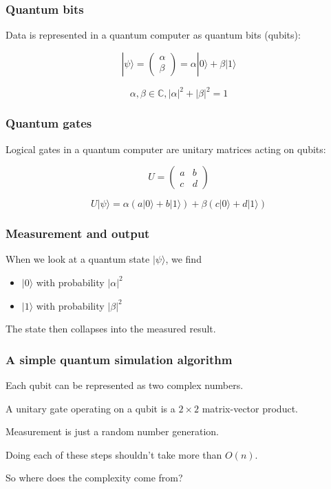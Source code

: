 \documentclass[notes]{beamer}
\begin{document}

\begin{frame}
\frametitle{Quantum bits}

Data is represented in a quantum computer as quantum bits (qubits):

$$
|\psi\rangle = \begin{pmatrix}
\alpha\\
\beta
\end{pmatrix} = \alpha|0\rangle + \beta|1\rangle
$$

$$\alpha, \beta \in \mathbb{C}, |\alpha|^2 + |\beta|^2 = 1$$
\end{frame}

\begin{frame}
\frametitle{Quantum gates}

Logical gates in a quantum computer are unitary matrices acting on qubits:

$$
U = \begin{pmatrix}
a & b\\
c & d
\end{pmatrix}
$$

$$U|\psi\rangle = \alpha(a|0\rangle + b|1\rangle) + \beta(c|0\rangle + d|1\rangle)$$
\end{frame}

\begin{frame}
\frametitle{Measurement and output}

When we look at a quantum state $|\psi\rangle$, we find

\begin{itemize}
\item $|0\rangle$ with probability $|\alpha|^2$
\item $|1\rangle$ with probability $|\beta|^2$
\end{itemize}

The state then collapses into the measured result.
\end{frame}

\begin{frame}
\frametitle{A simple quantum simulation algorithm}

Each qubit can be represented as two complex numbers.

A unitary gate operating on a qubit is a $2\times2$ matrix-vector product.

Measurement is just a random number generation.

Doing each of these steps shouldn't take more than $O(n)$.

So where does the complexity come from?
\end{frame}
\end{document}
